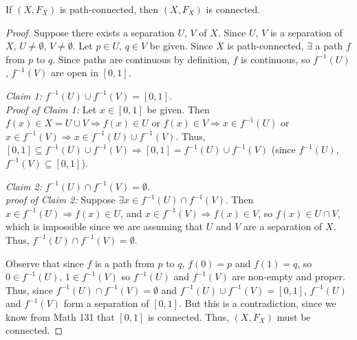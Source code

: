 \begin{theorem}
If $(X, F_X)$ is path-connected, then $(X, F_X)$ is connected.
\end{theorem}
\begin{proof}
 Suppose there exists a separation $U$, $V$ of $X$. Since $U$, $V$ is a separation of $X$, $U \neq \emptyset$, $V \neq \emptyset$. Let $p \in U$, $q \in V$ be given. Since $X$ is path-connected, $\exists$ a path $f$ from $p$ to $q$. Since paths are continuous by definition, $f$ is continuous, so $f^{-1}(U)$, $f^{-1}(V)$ are open in $[0,1]$. 
 
\emph{Claim 1:} $f^{-1}(U) \cup f^{-1}(V) = [0,1]$. 
\\ \emph{Proof of Claim 1:} Let $x \in [0,1]$ be given. Then $f(x) \in X = U \cup V \Rightarrow f(x) \in U$ or $f(x) \in V \Rightarrow x \in f^{-1}(U)$ or $x \in f^{-1}(V) \Rightarrow x \in f^{-1}(U) \cup f^{-1}(V)$. Thus, $[0,1] \subseteq f^{-1}(U) \cup f^{-1}(V) \Rightarrow [0,1] = f^{-1}(U) \cup f^{-1}(V)$ (since $f^{-1}(U)$, $f^{-1}(V) \subseteq [0,1]$).

\emph{Claim 2:} $f^{-1}(U) \cap f^{-1}(V) = \emptyset$.
\\ \emph{proof of Claim 2:} Suppose $\exists x \in f^{-1}(U) \cap f^{-1}(V)$. Then $x \in f^{-1}(U) \Rightarrow f(x) \in U$, and $x \in f^{-1}(V) \Rightarrow f(x) \in V$, so $f(x) \in U \cap V$, which is impossible since we are assuming that $U$ and $V$ are a separation of $X$. Thus, $f^{-1}(U) \cap f^{-1}(V) = \emptyset$.

Observe that since $f$ is a path from $p$ to $q$, $f(0) = p$ and $f(1) = q$, so $0 \in f^{-1}(U)$, $1 \in f^{-1}(V)$ so $f^{-1}(U)$ and $f^{-1}(V)$ are non-empty and proper. Thus, since $f^{-1}(U) \cap f^{-1}(V) = \emptyset$ and $f^{-1}(U) \cup f^{-1}(V) = [0,1]$, $f^{-1}(U)$ and $f^{-1}(V)$ form a separation of $[0,1]$. But this is a contradiction, since we know from Math 131 that $[0,1]$ is connected. Thus, $(X, F_X)$ must be connected. 
\end{proof}

